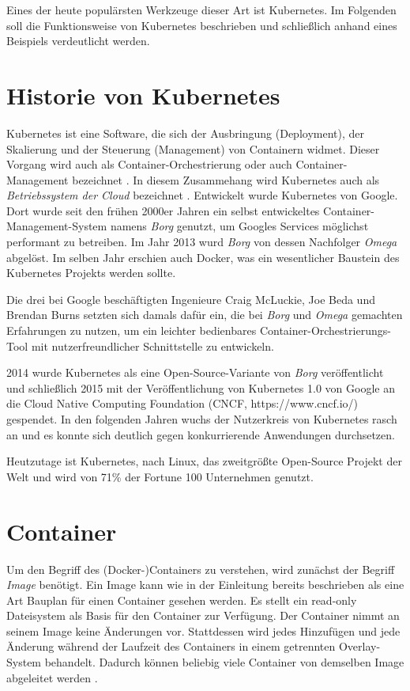 \documentclass[11pt,a4paper]{article}
\begin{document}
Eines der heute populärsten Werkzeuge dieser Art ist Kubernetes. Im Folgenden soll die Funktionsweise von Kubernetes beschrieben und schließlich anhand eines Beispiels 
verdeutlicht werden.

\section{Historie von Kubernetes}
Kubernetes ist eine Software, die sich der Ausbringung (Deployment), der Skalierung und der Steuerung (Management) von Containern widmet.
Dieser Vorgang wird auch als Container-Orchestrierung oder auch Container-Management bezeichnet \cite{Bisong2019}.
In diesem Zusammehang wird Kubernetes auch als \emph{Betriebssystem der Cloud} bezeichnet \cite{Schmeling_Dargatz_2022}. 
Entwickelt wurde Kubernetes von Google. Dort wurde seit den frühen 2000er Jahren ein selbst entwickeltes Container-Management-System namens \emph{Borg} genutzt,
um Googles Services möglichst performant zu betreiben. 
Im Jahr 2013 wurd \emph{Borg} von dessen Nachfolger \emph{Omega} abgelöst. Im selben Jahr erschien auch Docker, was ein wesentlicher Baustein des Kubernetes 
Projekts werden sollte.

Die drei bei Google beschäftigten Ingenieure Craig McLuckie, Joe Beda und Brendan Burns setzten sich damals dafür ein,
die bei \emph{Borg} und \emph{Omega} gemachten Erfahrungen zu nutzen, um ein leichter bedienbares Container-Orchestrierungs-Tool 
mit nutzerfreundlicher Schnittstelle zu entwickeln.

2014 wurde Kubernetes als eine Open-Source-Variante von \emph{Borg} veröffentlicht und schließlich 2015 mit der Veröffentlichung von Kubernetes 1.0
von Google an die Cloud Native Computing Foundation (CNCF, https://www.cncf.io/) gespendet. In den folgenden Jahren wuchs der Nutzerkreis von Kubernetes
rasch an und es konnte sich deutlich gegen konkurrierende Anwendungen durchsetzen.

Heutzutage ist Kubernetes, nach Linux, das zweitgrößte Open-Source Projekt der Welt und wird von 71\% der Fortune 100 Unternehmen genutzt. %

\section{Container}
\label{sec:Container}

Um den Begriff des (Docker-)Containers zu verstehen, wird zunächst der Begriff \emph{Image} benötigt.
Ein Image kann wie in der Einleitung bereits beschrieben als eine Art Bauplan für einen Container gesehen werden.
Es stellt ein read-only Dateisystem als Basis für den Container zur Verfügung. Der Container nimmt an seinem Image
keine Änderungen vor. Stattdessen wird jedes Hinzufügen und jede Änderung während der Laufzeit des Containers in einem
getrennten Overlay-System behandelt. Dadurch können beliebig viele Container von demselben Image abgeleitet werden \cite{kofler2021docker}. 
\end{document}
